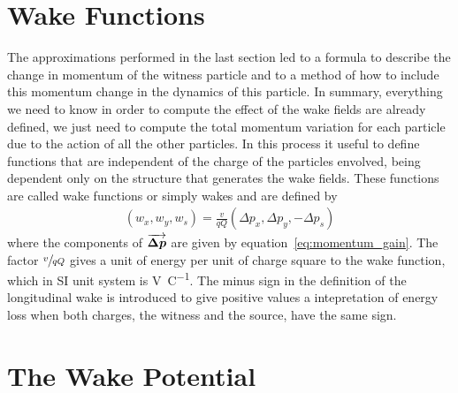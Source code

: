 \documentclass[
	12pt,				%
	openright,			%
	oneside,			%
	a4paper,		%
	chapter=TITLE,		%
	section=TITLE,		%
    brazil,				%
	english,			%
	sumario=tradicional,
	]{abntex2}
\begin{document}
  \section{Wake Functions}\label{sec:wake_functions}

  The approximations performed in the last section led to a formula to describe the change in momentum of the witness particle and to a method of how to include this momentum change in the dynamics of this particle. In summary, everything we need to know in order to compute the effect of the wake fields are already defined, we just need to compute the total momentum variation for each particle due to the action of all the other particles. In this process it useful to define functions that are independent of the charge of the particles envolved, being dependent only on the structure that generates the wake fields. These functions are called wake functions or simply wakes and are defined by
  \begin{align}\label{eq:wake_definition}
	  \left(w_x, w_y, w_s\right) =
	  \frac{v}{qQ} \left(\Delta p_x, \Delta p_y, -\Delta p_s\right)
  \end{align}
  where the components of $\overrightarrow{\boldsymbol{\Delta p}}$ are given by equation~\eqref{eq:momentum_gain}. The factor $\sfrac{v}{qQ}$ gives a unit of energy per unit of charge square to the wake function, which in SI unit system is \si{\volt\per\coulomb}.  The minus sign in the definition of the longitudinal wake is introduced to give positive values a intepretation of energy loss when both charges, the witness and the source, have the same sign.

  \section{The Wake Potential}
\end{document}
